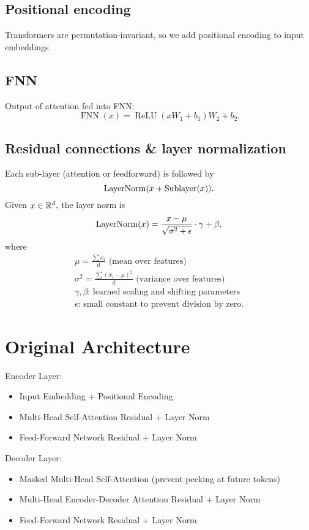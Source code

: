 \subsection{Positional encoding}
Transformers are permutation-invariant, so we add positional encoding to input embeddings.

\subsection{FNN}
Output of attention fed into FNN:
\[ \operatorname{FNN}(x) = \operatorname{ReLU}(xW_1 + b_1)W_2 + b_2. \]

\subsection{Residual connections \& layer normalization}
Each sub-layer (attention or feedforward) is followed by
\[ \operatorname{LayerNorm}(x + \operatorname{Sublayer}(x)). \]
Given $x \in \mathbb{R}^d,$ the layer norm is 
\[ \operatorname{LayerNorm}(x) = \frac{x - \mu}{\sqrt{\sigma^2 + \epsilon}} \cdot \gamma + \beta, \]
where
\begin{gather*}
    \mu = \frac{\sum x_i}{d} \text{ (mean over features)}\\
    \sigma^2 = \frac{\sum(x_i - \mu)^2}{d} \text{ (variance over features)}\\
    \gamma,\beta \text{: learned scaling and shifting parameters}\\
    \epsilon \text{: small constant to prevent division by zero}.
\end{gather*}

\section{Original Architecture}
Encoder Layer:
\begin{itemize}
    \item Input Embedding + Positional Encoding
    \item Multi-Head Self-Attention \textrightarrow{} Residual + Layer Norm
    \item Feed-Forward Network \textrightarrow{} Residual + Layer Norm
\end{itemize}
Decoder Layer:
\begin{itemize}
\item Masked Multi-Head Self-Attention (prevent peeking at future tokens)
\item Multi-Head Encoder-Decoder Attention \textrightarrow{} Residual + Layer Norm
\item Feed-Forward Network \textrightarrow{} Residual + Layer Norm
\end{itemize}

